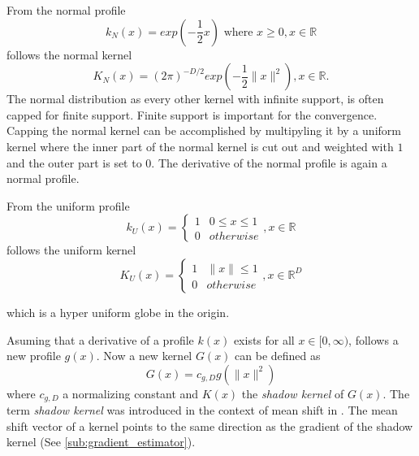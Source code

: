 From the normal profile
\begin{equation}\label{eq:nml}
	k_N(x) = exp \left( - \frac{1}{2} x \right) \textrm{ where } x \geq 0, x \in \mathbb{R}
\end{equation}
follows the normal kernel
\begin{equation}\label{eq:nmlk}
	K_N(x) = (2\pi)^{-D/2}exp\left( -\frac{1}{2} \lVert x \rVert^2 \right), x \in \mathbb{R}.
\end{equation}
The normal distribution as every other kernel with infinite support, is often
capped for finite support. Finite support is important for the convergence. Capping
the normal kernel can be accomplished by multipyling it by a uniform kernel where
the inner part of the normal kernel is cut out and weighted with $1$ and the 
outer part is set to $0$. The derivative of the normal profile is again a 
normal profile.

From the uniform profile 
\begin{equation}\label{eq:unf}
	k_U(x) = \begin{cases}
				1 &  0 \leq x \leq 1\\
				0 & \mathit{otherwise}
		\end{cases}, x \in \mathbb{R}
\end{equation}
follows the uniform kernel
\begin{equation}\label{eq:unfk}
	K_U(x) = \begin{cases}
				1 &  \lVert x \rVert  \leq 1\\
				0 & \mathit{otherwise}
		\end{cases}, x \in \mathbb{R}^D
\end{equation}

which is a {\color{Maroon}hyper uniform globe} in the origin. 

Asuming that a derivative of a profile $k(x)$ exists for all $x \in [0, \infty)$, 
follows a new profile $g(x)$. Now a new kernel $G(x)$ can be defined as 
\begin{equation}\label{eq:shadowk}
	G(x) = c_{g,D}g(\lVert x \rVert^2)
\end{equation}
where $c_{g,D}$ a normalizing constant and $K(x)$ the \emph{shadow kernel} of 
$G(x)$. The term \emph{shadow kernel} was introduced in the context of mean 
shift in \citep{citeulike:2522867}. The mean shift vector of a kernel points to 
the same direction as the gradient of the shadow kernel (See \autoref{sub:gradient_estimator}). 



